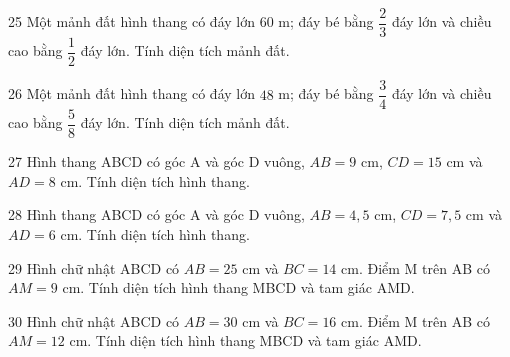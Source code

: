\gap
\begin{probbox}{25}{\relax}
Một mảnh đất hình thang có đáy lớn $60$ m; đáy bé bằng $\dfrac{2}{3}$ đáy lớn và chiều cao bằng $\dfrac{1}{2}$ đáy lớn. Tính diện tích mảnh đất.
\end{probbox}
\gap
\begin{probbox}{26}{\relax}
Một mảnh đất hình thang có đáy lớn $48$ m; đáy bé bằng $\dfrac{3}{4}$ đáy lớn và chiều cao bằng $\dfrac{5}{8}$ đáy lớn. Tính diện tích mảnh đất.
\end{probbox}
\gap
\begin{probbox}{27}{\relax}
Hình thang ABCD có góc A và góc D vuông, $AB=9$ cm, $CD=15$ cm và $AD=8$ cm. Tính diện tích hình thang.
\end{probbox}
\gap
\begin{probbox}{28}{\relax}
Hình thang ABCD có góc A và góc D vuông, $AB=4{,}5$ cm, $CD=7{,}5$ cm và $AD=6$ cm. Tính diện tích hình thang.
\end{probbox}
\gap
\begin{probbox}{29}{\relax}
Hình chữ nhật ABCD có $AB=25$ cm và $BC=14$ cm. Điểm M trên AB có $AM=9$ cm. Tính diện tích hình thang MBCD và tam giác AMD.
\end{probbox}
\gap
\begin{probbox}{30}{\relax}
Hình chữ nhật ABCD có $AB=30$ cm và $BC=16$ cm. Điểm M trên AB có $AM=12$ cm. Tính diện tích hình thang MBCD và tam giác AMD.
\end{probbox}
